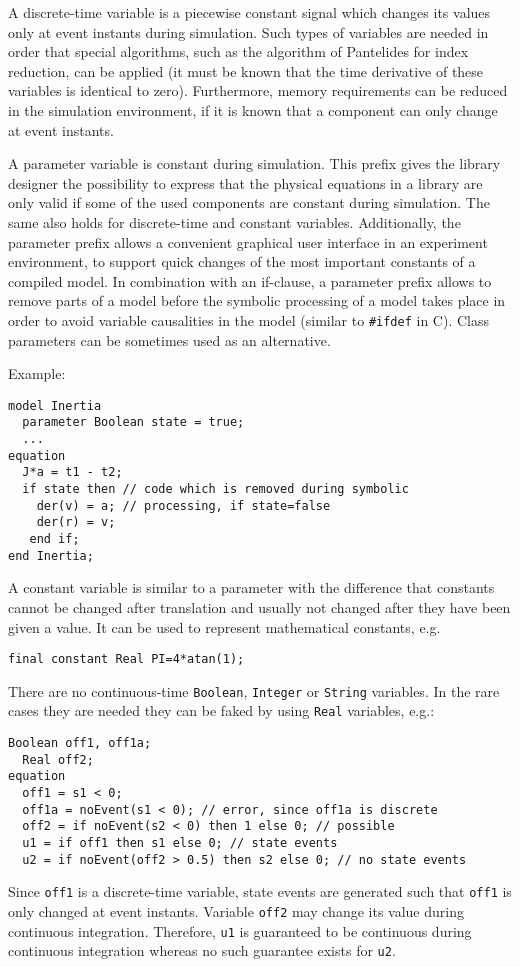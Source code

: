 \begin{nonnormative}
A discrete-time variable is a piecewise constant signal which
changes its values only at event instants during simulation. Such types
of variables are needed in order that special algorithms, such as the
algorithm of Pantelides for index reduction, can be applied (it must be
known that the time derivative of these variables is identical to zero).
Furthermore, memory requirements can be reduced in the simulation
environment, if it is known that a component can only change at event
instants.

A parameter variable is constant during simulation. This prefix
gives the library designer the possibility to express that the physical
equations in a library are only valid if some of the used components are
constant during simulation. The same also holds for discrete-time and
constant variables. Additionally, the parameter prefix allows a
convenient graphical user interface in an experiment environment, to
support quick changes of the most important constants of a compiled
model. In combination with an if-clause, a parameter prefix allows to
remove parts of a model before the symbolic processing of a model takes
place in order to avoid variable causalities in the model (similar to
\lstinline!#ifdef! in C). Class parameters can be sometimes used as an alternative.

Example:
\begin{lstlisting}[language=modelica]
model Inertia
  parameter Boolean state = true;
  ...
equation
  J*a = t1 - t2;
  if state then // code which is removed during symbolic
    der(v) = a; // processing, if state=false
    der(r) = v;
   end if;
end Inertia;
\end{lstlisting}

A constant variable is similar to a parameter with the difference
that constants cannot be changed after translation and usually not
changed after they have been given a value. It can be used to represent
mathematical constants, e.g.
\begin{lstlisting}[language=modelica]
final constant Real PI=4*atan(1);
\end{lstlisting}

There are no continuous-time \lstinline!Boolean!, \lstinline!Integer! or \lstinline!String!
variables. In the rare cases they are needed they can be
faked by using \lstinline!Real! variables, e.g.:
\begin{lstlisting}[language=modelica]
  Boolean off1, off1a;
  Real off2;
equation
  off1 = s1 < 0;
  off1a = noEvent(s1 < 0); // error, since off1a is discrete
  off2 = if noEvent(s2 < 0) then 1 else 0; // possible
  u1 = if off1 then s1 else 0; // state events
  u2 = if noEvent(off2 > 0.5) then s2 else 0; // no state events
\end{lstlisting}

Since \lstinline!off1! is a discrete-time variable, state events are
generated such that \lstinline!off1! is only changed at event instants.
Variable \lstinline!off2! may change its value during continuous integration.
Therefore, \lstinline!u1! is guaranteed to be continuous during continuous
integration whereas no such guarantee exists for \lstinline!u2!.
\end{nonnormative}

